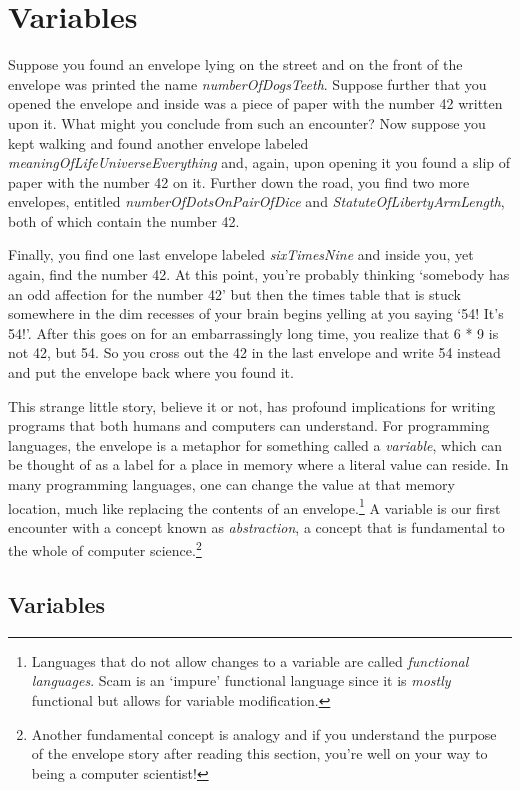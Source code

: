 \chapter{Variables}
\label{Variables}

Suppose you found an envelope lying on the street and on the front of
the envelope was printed the name {\it numberOfDogsTeeth}.
Suppose further
that you opened the envelope and inside was a piece of paper with
the number 42 written upon it.
What might you conclude from such an
encounter? Now suppose you kept walking and found another envelope
labeled {\it meaningOfLifeUniverseEverything} and,
again, upon opening it
you found a slip of paper with the number 42 on it.
Further down the
road,
you find two more envelopes,
entitled {\it numberOfDotsOnPairOfDice} and
{\it StatuteOfLibertyArmLength},
both of which contain the number 42.

Finally,
you find one last envelope labeled {\it sixTimesNine} and inside you,
yet again,
find the number 42.
At this point,
you're probably thinking `somebody
has an odd affection for the number 42' but then the times table that
is stuck somewhere in the dim recesses of your brain begins yelling at
you saying `54! It's 54!'.
After this goes on for an embarrassingly long
time,
you realize that 6 * 9 is not 42, but 54.
So you cross out the 42
in the last envelope and write 54 instead and put the envelope back
where you found it.

This strange little story,
believe it or not,
has profound implications
for writing programs that both humans and computers can understand.
For
programming languages,
the envelope is a metaphor for something called
a {\it variable},
which can be thought of as a label for a place in memory
where a literal value can reside.
In many programming languages,
one can change the value at that memory location,
much like replacing
the contents of an envelope.\footnote{
Languages that do not allow changes to a variable are called
{\it functional languages}.
Scam is an `impure' functional language
since it is {\it mostly} functional but allows for variable modification.
}
A variable is our first encounter with a
concept known as {\it abstraction},
a concept that is fundamental to the whole
of computer science.\footnote{
Another fundamental concept is analogy and if you understand the
purpose of the envelope story after reading this section,
you're well
on your way to being a computer scientist!
}

\section{Variables}

